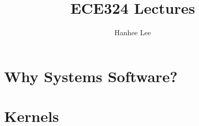 \documentclass[twoside]{article}
\title{ECE324 Lectures}
\author{Hanhee Lee}
\begin{document}
\maketitle

\tableofcontents

\begin{definition}
    
\end{definition}

\begin{process}

\end{process}

\begin{motivation}

\end{motivation}

\begin{derivation}

\end{derivation}

\begin{warning}

\end{warning}

\begin{summary}

\end{summary}

\begin{algo}

\end{algo}

\begin{example}
    
\end{example}

\begin{faq}

\end{faq}
\cleardoublepage

\section{Why Systems Software?}

\cleardoublepage

\section{Kernels} 

\cleardoublepage
\end{document}
